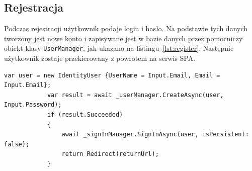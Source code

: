 	\subsection{Rejestracja}
		Podczas rejestracji użytkownik podaje login i hasło.
		Na podstawie tych danych tworzony jest nowe konto i zapisywane jest w bazie danych przez pomocniczy obiekt klasy \verb|UserManager|,
		jak ukazano na listingu~\ref{lst:register}.
		Następnie użytkownik zostaje przekierowany z powrotem na serwis SPA.

		\begin{lstlisting}[label=lst:register, caption=Fragment kodu rejestacji, float]
			var user = new IdentityUser {UserName = Input.Email, Email = Input.Email};
			var result = await _userManager.CreateAsync(user, Input.Password);
			if (result.Succeeded)
			{
				await _signInManager.SignInAsync(user, isPersistent: false);
				return Redirect(returnUrl);
			}
		\end{lstlisting}

